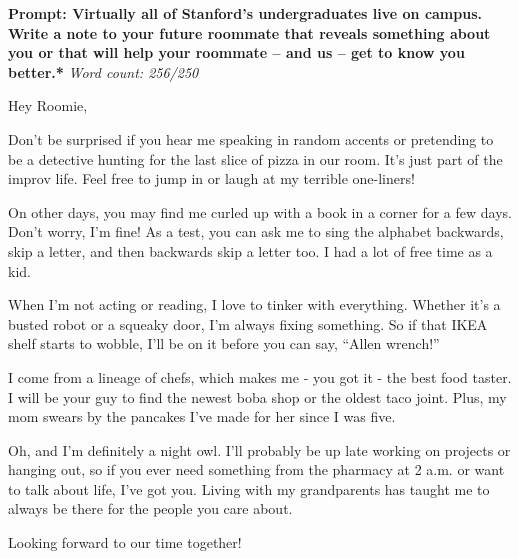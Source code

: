 \documentclass[10pt]{article}
\newcommand{\mybox}[3]{
    \begin{minipage}{\textwidth} %
        \begin{tcolorbox}[colback=grey, colframe=black, boxrule=0.5mm, width=\textwidth, sharp corners=south, enhanced]
            \textbf{#1} \textit{#2}
        \end{tcolorbox}
        \vspace{-16pt}
        \begin{tcolorbox}[colback=white, colframe=black, boxrule=0.5mm, width=\textwidth, sharp corners=north, top=0pt, enhanced]
            \vspace{1em}
            \setlength{\parskip}{1em}
            #3
        \end{tcolorbox}
    \end{minipage}
    \vspace{1em}
}
\begin{document}
\mybox{Prompt: Virtually all of Stanford's undergraduates live on campus. Write a note to your future roommate that reveals something about you or that will help your roommate – and us – get to know you better.*}{Word count: 256/250}{
Hey Roomie,

Don’t be surprised if you hear me speaking in random accents or pretending to be a detective hunting for the last slice of pizza in our room. It’s just part of the improv life. Feel free to jump in or laugh at my terrible one-liners! 

On other days, you may find me curled up with a book in a corner for a few days. Don’t worry, I’m fine! As a test, you can ask me to sing the alphabet backwards, skip a letter, and then backwards skip a letter too. I had a lot of free time as a kid.

When I’m not acting or reading, I love to tinker with everything. Whether it’s a busted robot or a squeaky door, I’m always fixing something. So if that IKEA shelf starts to wobble, I'll be on it before you can say, “Allen wrench!”

I come from a lineage of chefs, which makes me - you got it - the best food taster. I will be your guy to find the newest boba shop or the oldest taco joint. Plus, my mom swears by the pancakes I’ve made for her since I was five.

Oh, and I’m definitely a night owl. I’ll probably be up late working on projects or hanging out, so if you ever need something from the pharmacy at 2 a.m. or want to talk about life, I’ve got you. Living with my grandparents has taught me to always be there for the people you care about.

Looking forward to our time together!
}
\end{document}
